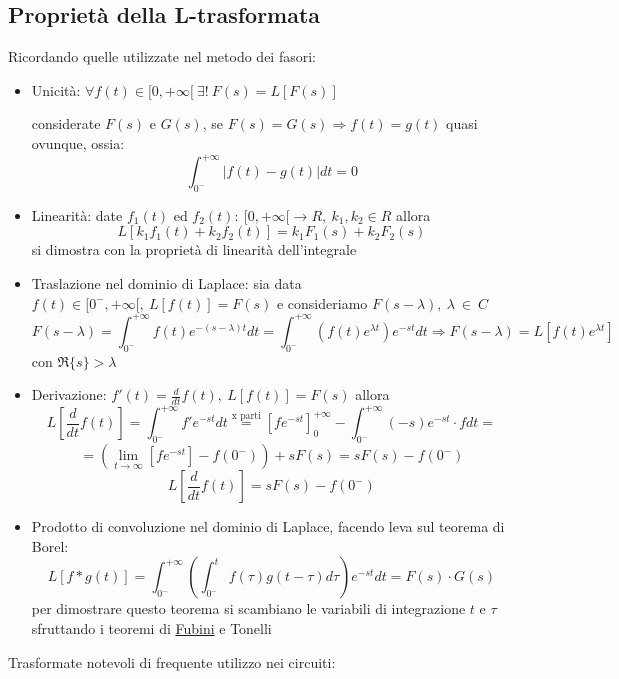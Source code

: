 \subsection{Proprietà della L-trasformata} Ricordando quelle utilizzate nel metodo dei fasori:
\begin{itemize}
\item Unicità: $\forall f(t) \in [0,+\infty[\ \exists!\ F(s) = L[F(s)]$

considerate $F(s)$ e $G(s)$, se $F(s) = G(s) \Rightarrow f(t) = g(t)$ quasi ovunque, ossia:
$$\int_{0^-}^{+\infty}|f(t) - g(t)|dt = 0$$

\item Linearità: date $f_1(t)$ ed $f_2(t) :\ [0,+\infty[ \rightarrow R,\ k_1,k_2 \in R$ allora
$$L[k_1f_1(t) + k_2f_2(t)] = k_1F_1(s) + k_2F_2(s) $$
si dimostra con la proprietà di linearità dell'integrale

\item Traslazione nel dominio di Laplace: sia data $f(t) \in [0^-,+\infty[,\ L[f(t)] = F(s)$ e
consideriamo $F(s-\lambda),\ \lambda\ \in\ C$ 
$$F(s-\lambda) = \int_{0^-}^{+\infty}f(t) e^{-(s-\lambda)t}dt = \int_{0^-}^{+\infty} (f(t)e^{\lambda t})e^{-st} dt \Rightarrow F(s-\lambda) = L[f(t) e^{\lambda t}]$$ con $\Re\{s\} > \lambda$ 

\item Derivazione: $f'(t)  = \frac{d}{dt}f(t),\ L[f(t)] = F(s)$ allora 
$$L\left[\frac{d}{dt}f(t)\right] = \int_{0^-}^{+\infty}f'e^{-st}dt \stackrel{\text{x parti}}{=} 
\left[fe^{-st}\right]_0^{+\infty} - \int_{0^-}^{+\infty}(-s)e^{-st}\cdot f dt =$$
$$= \left(\lim_{t\to\infty}\left[fe^{-st}\right]-f(0^-)\right) + sF(s) = sF(s) - f(0^-)$$
$$
L\left[\frac{d}{dt}f(t)\right] = sF(s) - f(0^-)
$$
\item Prodotto di convoluzione nel dominio di Laplace, facendo leva sul teorema di Borel:
$$
L\left[f*g(t)\right] =\int_{0^-}^{+\infty}\left(\int_{0^-}^{t}f(\tau)g(t-\tau)d\tau\right) e^{-st}dt = F(s)\cdot G(s)
$$
per dimostrare questo teorema si scambiano le variabili di integrazione $t$ e $\tau$ sfruttando i teoremi
di \href{https://it.wikipedia.org/wiki/Teorema_di_Fubini}{Fubini} e Tonelli
\end{itemize}
\newpage
Trasformate notevoli di frequente utilizzo nei circuiti:
